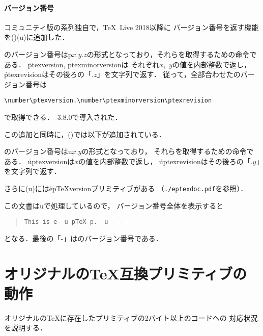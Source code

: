\documentclass[a4paper,11pt,nomag,dvipdfmx]{jsarticle}
\begin{document}
\subsection{バージョン番号}
コミュニティ版の\pTeX 系列独自で，\TeX~Live 2018以降に
バージョン番号を返す機能を(\eTeXpre)(u)\pTeX に追加した．
\begin{cslist}
  \pTeX のバージョン番号はp$x{.}y{.}z$の形式となっており，それらを取得するための命令である．
  \.{ptexversion}, \.{ptexminorversion}は
  それぞれ$x$,~$y$の値を内部整数で返し，\.{ptexrevision}はその後ろの「${.}z$」を文字列で返す．
  従って，全部合わせた\pTeX のバージョン番号は
\begin{verbatim}
\number\ptexversion.\number\ptexminorversion\ptexrevision
\end{verbatim}
  で取得できる．\pTeX~3.8.0で導入された．
\end{cslist}
この追加と同時に，(\eTeXpre)\upTeX では以下が追加されている．
\begin{cslist}
  \upTeX のバージョン番号はu$x{.}y$の形式となっており，
  それらを取得するための命令である．
  \.{uptexversion}は$x$の値を内部整数で返し，
  \.{uptexrevision}はその後ろの「${.}y$」を文字列で返す．
\end{cslist}
さらに\eTeXpre(u)\pTeX には\.{epTeXversion}プリミティブがある
（\texttt{./eptexdoc.pdf}を参照）．

\medskip

この文書は\eTeXpre\ifx\kchardef\undefined\else u\fi\pTeX で処理しているので，
バージョン番号全体を表示すると
\begin{quote}
\texttt{This is
  \ifx\eTeXversion\undefined\else e-\fi
  \ifx\enablecjktoken\undefined\else u\fi
  pTeX p\the\ptexversion.\the\ptexminorversion\ptexrevision
  \ifx\enablecjktoken\undefined\else -u\the\uptexversion\uptexrevision\fi
  \ifx\epTeXversion\undefined\else -\the\epTeXversion
  -\the\eTeXversion\eTeXrevision\fi}
\end{quote}
となる．最後の「-\the\eTeXversion\eTeXrevision」は\eTeX のバージョン番号である．

\newpage

\part{オリジナルの\TeX 互換プリミティブの動作}

オリジナルの\TeX に存在したプリミティブの2バイト以上のコードへの
対応状況を説明する．
\end{document}
